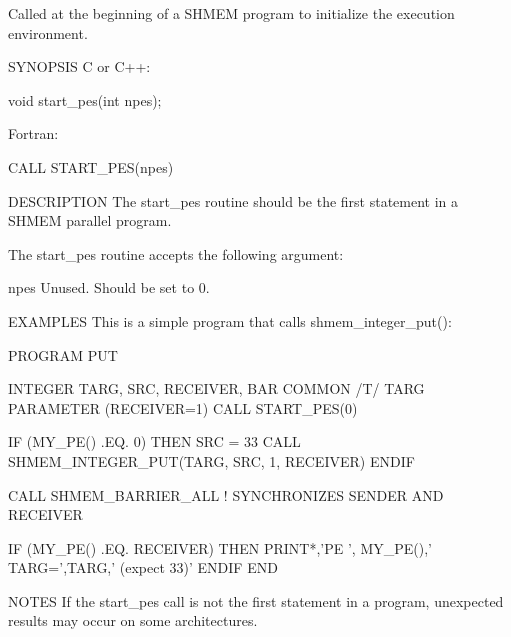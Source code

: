        Called  at the beginning of a SHMEM program to initialize
       the execution environment.

SYNOPSIS
       C or C++:

	  void start_pes(int npes);

       Fortran:

	  CALL START_PES(npes)

DESCRIPTION
       The start_pes routine should be the first statement in a SHMEM parallel
       program.

       The start_pes routine accepts the following argument:

       npes	 Unused.  Should be set to 0.


EXAMPLES
       This is a simple program that calls shmem_integer_put():

	     PROGRAM PUT

	     INTEGER TARG, SRC, RECEIVER, BAR
	     COMMON /T/ TARG
	     PARAMETER (RECEIVER=1)
	     CALL START_PES(0)

	     IF (MY_PE() .EQ. 0) THEN
		 SRC = 33
		 CALL SHMEM_INTEGER_PUT(TARG, SRC, 1, RECEIVER)
	     ENDIF

	     CALL SHMEM_BARRIER_ALL	      ! SYNCHRONIZES SENDER AND RECEIVER

	     IF (MY_PE() .EQ. RECEIVER) THEN
		 PRINT*,'PE ', MY_PE(),' TARG=',TARG,' (expect 33)'
	     ENDIF
	     END


NOTES
       If  the	start_pes  call	 is  not  the  first  statement	 in a program,
       unexpected results may occur on some architectures.


